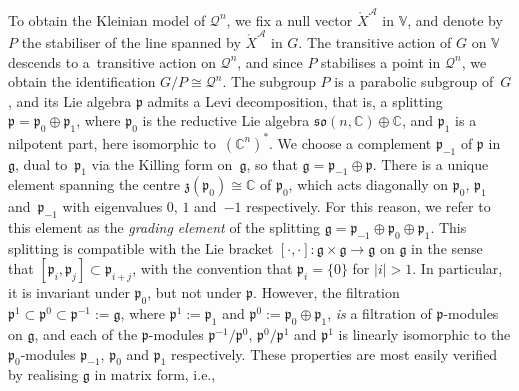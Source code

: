 \documentclass[10pt,a4paper]{amsart}
\numberwithin{equation}{section}
\newcommand{\mc} [1]{\mathcal{#1}}
\newcommand{\mr}[1] {\mathring{#1}}
\newcommand{\so} {\mathfrak{so}}
\newcommand{\g} {\mathfrak{g}}
\newcommand{\mfp} {\mathfrak{p}}
\newcommand{\mfz} {\mathfrak{z}}
\newcommand{\C} {\mathbb{C}}
\newcommand{\V} {\mathbb{V}}
\begin{document}
To obtain the Kleinian model of $\mc{Q}^n$, we f\/ix a null vector $\mr{X}^\mc{A}$ in $\V$, and denote by $P$ the stabiliser of the line spanned by $\mr{X}^\mc{A}$ in $G$. The transitive action of $G$ on $\V$ descends to a~transitive action on $\mc{Q}^n$, and since $P$ stabilises a point in $\mc{Q}^n$, we obtain the identif\/ication $G/P \cong \mc{Q}^n$. The subgroup $P$ is a parabolic subgroup of~$G$, and its Lie algebra $\mfp$ admits a Levi decomposition, that is, a splitting $\mfp = \mfp_0 \oplus \mfp_1$, where $\mfp_0$ is the reductive Lie algebra $\so(n,\C) \oplus \C$, and $\mfp_1$ is a nilpotent part, here isomorphic to~$(\C^n)^*$. We choose a complement $\mfp_{-1}$ of $\mfp$ in~$\g$, dual to~$\mfp_1$ via the Killing form on~$\g$, so that $\g = \mfp_{-1} \oplus \mfp$. There is a unique element spanning the centre $\mfz(\mfp_0) \cong \C$ of $\mfp_0$, which acts diagonally on $\mfp_0$, $\mfp_1$ and~$\mfp_{-1}$ with eigenvalues $0$, $1$ and~$-1$ respectively. For this reason, we refer to this element as the \emph{grading element} of the splitting $\g = \mfp_{-1} \oplus \mfp_0 \oplus \mfp_1$. This splitting is compatible with the Lie bracket $[ \cdot , \cdot ] \colon \g \times \g \rightarrow \g$ on $\g$ in the sense that $[ \mfp_i , \mfp_j ] \subset \mfp_{i+j}$, with the convention that $\mfp_i = \{ 0 \}$ for $|i|>1$. In particular, it is invariant under $\mfp_0$, but not under $\mfp$. However, the f\/iltration $\mfp^1 \subset \mfp^0 \subset \mfp^{-1} := \g$, where $\mfp^1 := \mfp_1$ and $\mfp^0 := \mfp_0 \oplus \mfp_1$, \emph{is} a f\/iltration of $\mfp$-modules on $\g$, and each of the $\mfp$-modules $\mfp^{-1}/\mfp^0$, $\mfp^0/\mfp^1$ and $\mfp^1$ is linearly isomorphic to the $\mfp_0$-modules $\mfp_{-1}$, $\mfp_0$ and $\mfp_1$ respectively. These properties are most easily verif\/ied by realising $\g$ in matrix form, i.e.,
\end{document}
